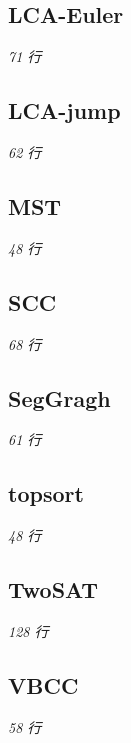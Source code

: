 \documentclass[12pt, UTF8]{ctexart}
\begin{document}


\subsection{LCA-Euler}\hfill\normalsize\textit{71 行}



\subsection{LCA-jump}\hfill\normalsize\textit{62 行}



\subsection{MST}\hfill\normalsize\textit{48 行}



\subsection{SCC}\hfill\normalsize\textit{68 行}



\subsection{SegGragh}\hfill\normalsize\textit{61 行}



\subsection{topsort}\hfill\normalsize\textit{48 行}



\subsection{TwoSAT}\hfill\normalsize\textit{128 行}



\subsection{VBCC}\hfill\normalsize\textit{58 行}
\end{document}
